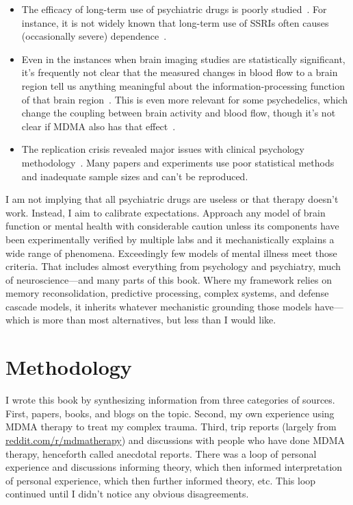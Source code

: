 \documentclass[11pt,oneside]{book}
\let\cite\parencite
\begin{document}
\begin{itemize}
    Imprecise questionnaires, which persist partly because we don't understand the intermediate processes, may measure the wrong thing or miss major relevant effects. The drug may superficially improve some symptoms while creating other, harder-to-see problems.
    \item The efficacy of long-term use of psychiatric drugs is poorly studied~\cite{leuchtDecline}. For instance, it is not widely known that long-term use of SSRIs often causes (occasionally severe) dependence~\cite{crossingZero}.
    \item Even in the instances when brain imaging studies are statistically significant, it's frequently not clear that the measured changes in blood flow to a brain region tell us anything meaningful about the information-processing function of that brain region~\cite{jonas2017microprocessor,dewit2016neuroimaging,alikoEntireBrain}. This is even more relevant for some psychedelics, which change the coupling between brain activity and blood flow, though it's not clear if MDMA also has that effect~\cite{padawerNeurovascularCoupling}.
    \item The replication crisis revealed major issues with clinical psychology methodology~\cite{therapyReplicationCrisis}. Many papers and experiments use poor statistical methods and inadequate sample sizes and can't be reproduced.
\end{itemize}

I am not implying that all psychiatric drugs are useless or that therapy doesn't work. Instead, I aim to calibrate expectations. Approach any model of brain function or mental health with considerable caution unless its components have been experimentally verified by multiple labs and it mechanistically explains a wide range of phenomena. Exceedingly few models of mental illness meet those criteria. That includes almost everything from psychology and psychiatry, much of neuroscience---and many parts of this book. Where my framework relies on memory reconsolidation, predictive processing, complex systems, and defense cascade models, it inherits whatever mechanistic grounding those models have---which is more than most alternatives, but less than I would like.

\section{Methodology}
\label{methodology}
I wrote this book by synthesizing information from three categories of sources. First, papers, books, and blogs on the topic. Second, my own experience using MDMA therapy to treat my complex trauma. Third, trip reports (largely from \href{https://www.reddit.com/r/mdmatherapy}{reddit.com/r/mdmatherapy}) and discussions with people who have done MDMA therapy, henceforth called anecdotal reports. There was a loop of personal experience and discussions informing theory, which then informed interpretation of personal experience, which then further informed theory, etc. This loop continued until I didn't notice any obvious disagreements.
\end{document}

